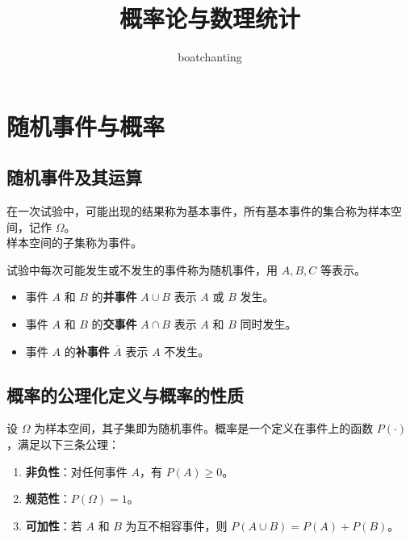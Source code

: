 \documentclass[UTF8]{ctexart}
\title{ \fontsize{24pt}{24pt}\selectfont 概率论与数理统计} %
\author{\fontsize{20pt}{20pt}\selectfont boatchanting} %
\date{}
\begin{document}
	\maketitle
	
	\section{随机事件与概率}
	
	\subsection{随机事件及其运算}
	
	
	\begin{tcolorbox}[colback=definition!5!white, colframe=definition!75!black, title=事件的定义]
		在一次试验中，可能出现的结果称为基本事件，所有基本事件的集合称为样本空间，记作 $\Omega$。\\
		样本空间的子集称为事件。
	\end{tcolorbox}
	
	\begin{tcolorbox}[colback=definition!5!white, colframe=definition!75!black, title=随机事件]
		试验中每次可能发生或不发生的事件称为随机事件，用 $A, B, C$ 等表示。
	\end{tcolorbox}
	
	\begin{tcolorbox}[colback=definition!5!white, colframe=definition!75!black, title=事件的运算]
		\begin{itemize}
			\item 事件 $A$ 和 $B$ 的\textbf{并事件} $A \cup B$ 表示 $A$ 或 $B$ 发生。
			\item 事件 $A$ 和 $B$ 的\textbf{交事件} $A \cap B$ 表示 $A$ 和 $B$ 同时发生。
			\item 事件 $A$ 的\textbf{补事件} $\bar{A}$ 表示 $A$ 不发生。
		\end{itemize}
	\end{tcolorbox}
	
	\subsection{概率的公理化定义与概率的性质}
	
	\begin{tcolorbox}[colback=definition!5!white, colframe=definition!75!black, title=概率的公理化定义]
		设 $\Omega$ 为样本空间，其子集即为随机事件。概率是一个定义在事件上的函数 $P(\cdot)$，满足以下三条公理：
		\begin{enumerate}
			\item \textbf{非负性}：对任何事件 $A$，有 $P(A) \geq 0$。
			\item \textbf{规范性}：$P(\Omega) = 1$。
			\item \textbf{可加性}：若 $A$ 和 $B$ 为互不相容事件，则 $P(A \cup B) = P(A) + P(B)$。
		\end{enumerate}
	\end{tcolorbox}
	
\end{document}
